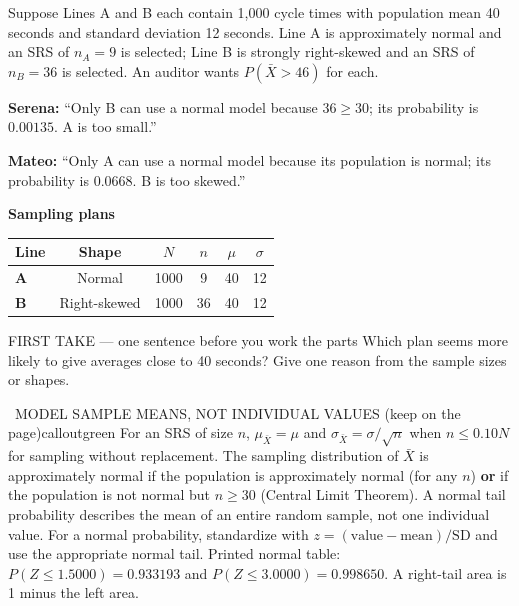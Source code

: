 \documentclass[11pt]{article}
\begin{document}


Suppose Lines A and B each contain 1{,}000 cycle times with population mean 40 seconds and standard deviation 12 seconds. Line A is approximately normal and an SRS of $n_A=9$ is selected; Line B is strongly right-skewed and an SRS of $n_B=36$ is selected. An auditor wants $P(\bar X>46)$ for each.\par\smallskip \textbf{Serena:} ``Only B can use a normal model because $36\geq30$; its probability is $0.00135$. A is too small.''\par \textbf{Mateo:} ``Only A can use a normal model because its population is normal; its probability is $0.0668$. B is too skewed.''\par
\begin{center}
\textbf{Sampling plans}\par\smallskip
\begin{tabular}{|l|c|c|c|c|c|}
\hline
\textbf{Line} & \textbf{Shape} & \textbf{$N$} & \textbf{$n$} & \textbf{$\mu$} & \textbf{$\sigma$} \\ \hline
\textbf{A} & Normal & 1000 & 9 & 40 & 12 \\ \hline
\textbf{B} & Right-skewed & 1000 & 36 & 40 & 12 \\ \hline
\end{tabular}
\end{center}
\begin{firsttakebox}{FIRST TAKE --- one sentence before you work the parts}
Which plan seems more likely to give averages close to 40 seconds? Give one reason from the sample sizes or shapes.
\workspace{0.9in}
\end{firsttakebox}

\begin{callout}{\IconBook\ MODEL SAMPLE MEANS, NOT INDIVIDUAL VALUES (keep on the page)}{calloutgreen}
For an SRS of size $n$, $\mu_{\bar X}=\mu$ and $\sigma_{\bar X}=\sigma/\sqrt n$ when
$n\leq0.10N$ for sampling without replacement. The sampling distribution of $\bar X$ is
approximately normal if the population is approximately normal (for any $n$)
\textbf{or} if the population is not normal but $n\geq30$ (Central Limit Theorem).
A normal tail probability describes the mean of an entire random sample, not one individual value.
For a normal probability, standardize with $z=(\text{value}-\text{mean})/\text{SD}$ and use the appropriate normal tail.
Printed normal table: $P(Z\leq1.5000)=0.933193$ and $P(Z\leq3.0000)=0.998650$. A right-tail area is 1 minus the left area.
\end{callout}
\end{document}
